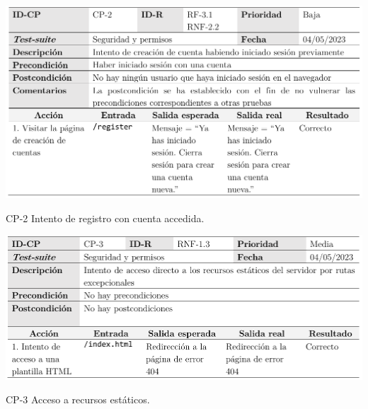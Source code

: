 \begin{table}[p]
	\centering
	\includegraphics[width=\textwidth]{../img/anexos/cp/CP-2}
	\caption{CP-2 Intento de registro con cuenta accedida.}
	\label{cp:registro}
\end{table}

\begin{table}[p]
	\centering
	\includegraphics[width=\textwidth]{../img/anexos/cp/CP-3}
	\caption{CP-3 Acceso a recursos estáticos.}
	\label{cp:acc-html}
\end{table}


